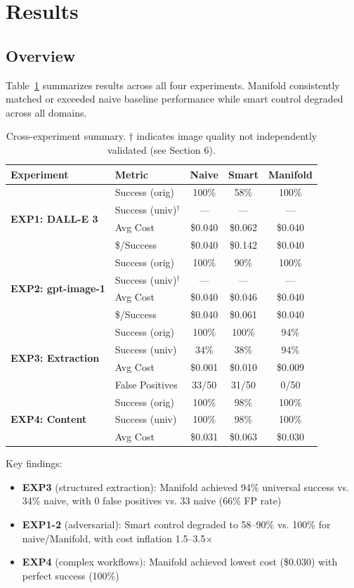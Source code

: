 \documentclass{article}
\begin{document}
\section{Results}

\subsection{Overview}
Table~\ref{tab:main_summary} summarizes results across all four experiments. Manifold consistently matched or exceeded naive baseline performance while smart control degraded across all domains.
\begin{table}[h]
\centering
\caption{Cross-experiment summary. $\dagger$ indicates image quality not independently validated (see Section 6).}
\label{tab:main_summary}
\small
\begin{tabular}{@{}llccc@{}}
\toprule
\textbf{Experiment} & \textbf{Metric} & \textbf{Naive} & \textbf{Smart} & \textbf{Manifold} \\
\midrule
\multirow{4}{*}{\textbf{EXP1: DALL-E 3}}
& Success (orig) & 100\% & 58\% & 100\% \\
& Success (univ)$^\dagger$ & --- & --- & --- \\
& Avg Cost & \$0.040 & \$0.062 & \$0.040 \\
& \$/Success & \$0.040 & \$0.142 & \$0.040 \\
\midrule
\multirow{4}{*}{\textbf{EXP2: gpt-image-1}}
& Success (orig) & 100\% & 90\% & 100\% \\
& Success (univ)$^\dagger$ & --- & --- & --- \\
& Avg Cost & \$0.040 & \$0.046 & \$0.040 \\
& \$/Success & \$0.040 & \$0.061 & \$0.040 \\
\midrule
\multirow{4}{*}{\textbf{EXP3: Extraction}}
& Success (orig) & 100\% & 100\% & 94\% \\
& Success (univ) & 34\% & 38\% & 94\% \\
& Avg Cost & \$0.001 & \$0.010 & \$0.009 \\
& False Positives & 33/50 & 31/50 & 0/50 \\
\midrule
\multirow{3}{*}{\textbf{EXP4: Content}}
& Success (orig) & 100\% & 98\% & 100\% \\
& Success (univ) & 100\% & 98\% & 100\% \\
& Avg Cost & \$0.031 & \$0.063 & \$0.030 \\
\bottomrule
\end{tabular}
\end{table}
Key findings:
\begin{itemize}
\item \textbf{EXP3} (structured extraction): Manifold achieved 94\% universal success vs. 34\% naive, with 0 false positives vs. 33 naive (66\% FP rate)
\item \textbf{EXP1-2} (adversarial): Smart control degraded to 58--90\% vs. 100\% for naive/Manifold, with cost inflation 1.5--3.5$\times$
\item \textbf{EXP4} (complex workflows): Manifold achieved lowest cost (\$0.030) with perfect success (100\%)
\end{itemize}
\end{document}

